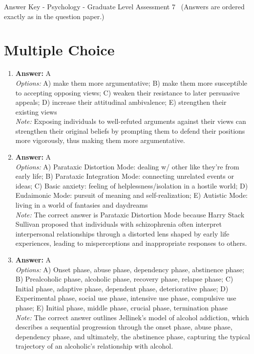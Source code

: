 \documentclass[12pt]{article}
\begin{document}
\begin{center}
Answer Key - Psychology - Graduate Level Assessment 7 \
\small (Answers are ordered exactly as in the question paper.)
\end{center}

\section*{Multiple Choice}
\begin{enumerate}[label=\arabic*.]
\item \textbf{Answer:} A
\\ \textit{Options:} A) make them more argumentative; B) make them more susceptible to accepting opposing views; C) weaken their resistance to later persuasive appeals; D) increase their attitudinal ambivalence; E) strengthen their existing views
\\ \textit{Note:} Exposing individuals to well-refuted arguments against their views can strengthen their original beliefs by prompting them to defend their positions more vigorously, thus making them more argumentative.
\item \textbf{Answer:} A
\\ \textit{Options:} A) Parataxic Distortion Mode: dealing w/ other like they're from early life; B) Parataxic Integration Mode: connecting unrelated events or ideas; C) Basic anxiety: feeling of helplessness/isolation in a hostile world; D) Eudaimonic Mode: pursuit of meaning and self-realization; E) Autistic Mode: living in a world of fantasies and daydreams
\\ \textit{Note:} The correct answer is Parataxic Distortion Mode because Harry Stack Sullivan proposed that individuals with schizophrenia often interpret interpersonal relationships through a distorted lens shaped by early life experiences, leading to misperceptions and inappropriate responses to others.
\item \textbf{Answer:} A
\\ \textit{Options:} A) Onset phase, abuse phase, dependency phase, abstinence phase; B) Prealcoholic phase, alcoholic phase, recovery phase, relapse phase; C) Initial phase, adaptive phase, dependent phase, deteriorative phase; D) Experimental phase, social use phase, intensive use phase, compulsive use phase; E) Initial phase, middle phase, crucial phase, termination phase
\\ \textit{Note:} The correct answer outlines Jellinek's model of alcohol addiction, which describes a sequential progression through the onset phase, abuse phase, dependency phase, and ultimately, the abstinence phase, capturing the typical trajectory of an alcoholic's relationship with alcohol.

\end{enumerate}
\end{document}
